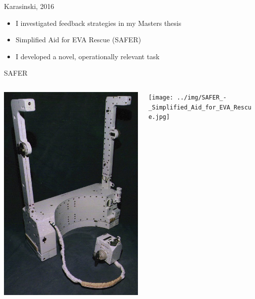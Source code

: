 \documentclass[10pt]{beamer}
\begin{document}
\begin{frame}[fragile]{Karasinski, 2016~\cite{Karasinski2016Masters}}
  \begin{itemize}
    \setlength\itemsep{1em}
    \item I investigated feedback strategies in my Masters thesis
    \item Simplified Aid for EVA Rescue (SAFER)
    \item I developed a novel, operationally relevant task
  \end{itemize}
\end{frame}

\begin{frame}[fragile]{SAFER}
  \begin{columns}[T]
    \begin{column}{.5\textwidth}
      \hfill
      \includegraphics[height=1.3\textwidth]{../img/SAFER_-_Simplified_Aid_for_EVA_Rescue_2.jpg}
    \end{column}%
    \begin{column}{.5\textwidth}
      \texttt{[image: ../img/SAFER\_-\_Simplified\_Aid\_for\_EVA\_Rescue.jpg]}
    \end{column}
  \end{columns}
\end{frame}
\end{document}
